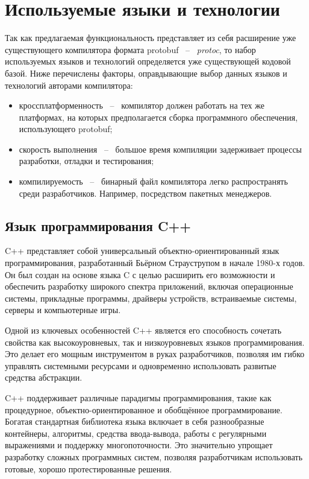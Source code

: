 \section{Используемые языки и технологии}

Так как предлагаемая функциональность представляет из себя расширение уже существующего компилятора формата protobuf ~--~ \textit{protoc}, то набор
используемых языков и технологий определяется уже существующей кодовой базой. Ниже перечислены факторы, оправдывающие выбор данных языков и технологий авторами компилятора:
\begin{itemize}
    \item кроссплатформенность ~--~ компилятор должен работать на тех же платформах, на которых предполагается сборка программного обеспечения, использующего protobuf;
    \item скорость выполнения ~--~ большое время компиляции задерживает процессы разработки, отладки и тестирования;
    \item компилируемость ~--~ бинарный файл компилятора легко распространять среди разработчиков. Например, посредством пакетных менеджеров.
\end{itemize}

\subsection{Язык программирования C++}

C++ представляет собой универсальный объектно-ориентированный язык программирования, разработанный Бьёрном Страуструпом в начале 1980-х годов. Он был создан на основе языка C с целью расширить его возможности и обеспечить разработку широкого спектра приложений, включая операционные системы, прикладные программы, драйверы устройств, встраиваемые системы, серверы и компьютерные игры.

Одной из ключевых особенностей C++ является его способность сочетать свойства как высокоуровневых, так и низкоуровневых языков программирования. Это делает его мощным инструментом в руках разработчиков, позволяя им гибко управлять системными ресурсами и одновременно использовать развитые средства абстракции.

C++ поддерживает различные парадигмы программирования, такие как процедурное, объектно-ориентированное и обобщённое программирование. Богатая стандартная библиотека языка включает в себя разнообразные контейнеры, алгоритмы, средства ввода-вывода, работы с регулярными выражениями и поддержку многопоточности. Это значительно упрощает разработку сложных программных систем, позволяя разработчикам использовать готовые, хорошо протестированные решения.

